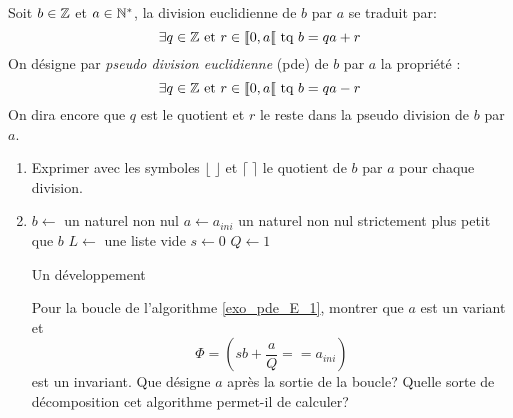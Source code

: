 Soit $b\in \mathbb{Z}$ et $a\in \mathbb{N}^*$, la division euclidienne de $b$ par $a$ se traduit par:
\begin{displaymath}
  \exists q\in \mathbb{Z} \text{ et } r\in \llbracket 0, a \llbracket \text{ tq } b = qa +r
\end{displaymath}
On désigne par \emph{pseudo division euclidienne} (pde) de $b$ par $a$ la propriété :
\begin{displaymath}
  \exists q\in \mathbb{Z} \text{ et } r\in \llbracket 0, a \llbracket \text{ tq } b = qa - r
\end{displaymath}
On dira encore que $q$ est le quotient et $r$ le reste dans la pseudo division de $b$ par $a$.
\begin{enumerate}
  \item Exprimer avec les symboles $\lfloor\;\rfloor$ et $\lceil\;\rceil$ le quotient de $b$ par $a$ pour chaque division.
  \item 
\begin{algorithm}
  $b\leftarrow$ un naturel non nul\;
  $a\leftarrow a_{ini}$ un naturel non nul strictement plus petit que $b$\;
  $L\leftarrow$ une liste vide\;
  $s\leftarrow 0$\;
  $Q\leftarrow 1$\;
  \caption{Un développement}
  \label{exo_pde_E_1}
\end{algorithm}
Pour la boucle de l'algorithme \ref{exo_pde_E_1}, montrer que $a$ est un variant et 
\begin{displaymath}
  \Phi = \left( sb + \frac{a}{Q} == a_{ini}\right) 
\end{displaymath}
est un invariant. Que désigne $a$ après la sortie de la boucle? Quelle sorte de décomposition cet algorithme permet-il de calculer?
\end{enumerate}
